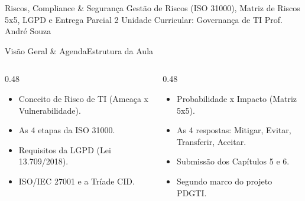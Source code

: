 
\senaicover
  {Riscos, Compliance \& Segurança}
  {Gestão de Riscos (ISO 31000), Matriz de Riscos 5x5, LGPD e Entrega Parcial 2}
  {Unidade Curricular: Governança de TI}
  {Prof. André Souza}

\begin{senaiframe}{Visão Geral \& Agenda}{Estrutura da Aula}
  \begin{columns}[t]
    \begin{column}{0.48\textwidth}
      \begin{tcolorbox}[senaibluecard, title={1. Gestão de Riscos}]
        \begin{itemize}
          \item Conceito de Risco de TI (Ameaça x Vulnerabilidade).
          \item As 4 etapas da ISO 31000.
        \end{itemize}
      \end{tcolorbox}
      \vspace{4pt}
      \begin{tcolorbox}[senaiambercard, title={3. Compliance Regulatório}]
        \begin{itemize}
          \item Requisitos da LGPD (Lei 13.709/2018).
          \item ISO/IEC 27001 e a Tríade CID.
        \end{itemize}
      \end{tcolorbox}
    \end{column}
    \begin{column}{0.48\textwidth}
      \begin{tcolorbox}[senairedcard, title={2. Matriz de Riscos}]
        \begin{itemize}
          \item Probabilidade x Impacto (Matriz 5x5).
          \item As 4 respostas: Mitigar, Evitar, Transferir, Aceitar.
        \end{itemize}
      \end{tcolorbox}
      \vspace{4pt}
      \begin{tcolorbox}[senaigreencard, title={4. Entrega Parcial 2}]
        \begin{itemize}
          \item Submissão dos Capítulos 5 e 6.
          \item Segundo marco do projeto PDGTI.
        \end{itemize}
      \end{tcolorbox}
    \end{column}
  \end{columns}
\end{senaiframe}


